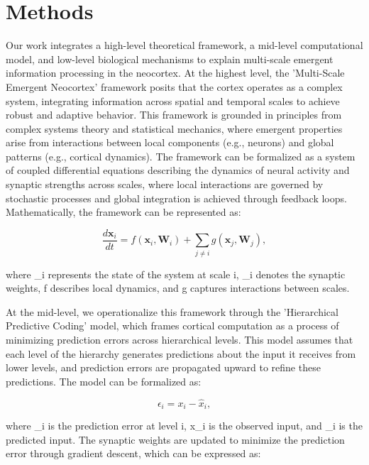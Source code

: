 \documentclass{article}
\begin{document}
\section{Methods}
Our work integrates a high-level theoretical framework, a mid-level computational model, and low-level biological mechanisms to explain multi-scale emergent information processing in the neocortex. At the highest level, the 'Multi-Scale Emergent Neocortex' framework posits that the cortex operates as a complex system, integrating information across spatial and temporal scales to achieve robust and adaptive behavior. This framework is grounded in principles from complex systems theory and statistical mechanics, where emergent properties arise from interactions between local components (e.g., neurons) and global patterns (e.g., cortical dynamics). The framework can be formalized as a system of coupled differential equations describing the dynamics of neural activity and synaptic strengths across scales, where local interactions are governed by stochastic processes and global integration is achieved through feedback loops. Mathematically, the framework can be represented as:

\begin{equation}
\frac{d\mathbf{x}_i}{dt} = f(\mathbf{x}_i, \mathbf{W}_i) + \sum_{j \neq i} g(\mathbf{x}_j, \mathbf{W}_j),
\end{equation}

where _i represents the state of the system at scale i, _i denotes the synaptic weights, f describes local dynamics, and g captures interactions between scales.

At the mid-level, we operationalize this framework through the 'Hierarchical Predictive Coding' model, which frames cortical computation as a process of minimizing prediction errors across hierarchical levels. This model assumes that each level of the hierarchy generates predictions about the input it receives from lower levels, and prediction errors are propagated upward to refine these predictions. The model can be formalized as:

\begin{equation}
\epsilon_i = x_i - \hat{x}_i,
\end{equation}

where \epsilon_i is the prediction error at level i, x_i is the observed input, and _i is the predicted input. The synaptic weights are updated to minimize the prediction error through gradient descent, which can be expressed as:
\end{document}
